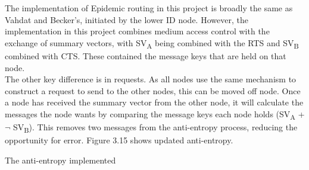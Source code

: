\documentclass[12pt,a4paper]{report}
\makeatletter
\newenvironment{figurehere}
  {\def\@captype{figure}}
  {}
\makeatother
\begin{document}
The implementation of Epidemic routing in this project is broadly the same as Vahdat and Becker's, initiated by the lower ID node. However, the implementation in this project combines medium access control with the exchange of summary vectors, with SV\textsubscript{A} being combined with the RTS and SV\textsubscript{B} combined with CTS. These contained the message keys that are held on that node. \\
The other key difference is in requests. As all nodes use the same mechanism to construct a request to send to the other nodes, this can be moved off node. Once a node has received the summary vector from the other node, it will calculate the messages the node wants by comparing the message keys each node holds (SV\textsubscript{A} + $\neg$ SV\textsubscript{B}). This removes two messages from the anti-entropy process, reducing the opportunity for error. Figure 3.15 shows updated anti-entropy.

\begin{figurehere} 
\begin{center}
\end{center}
\caption{The anti-entropy implemented}
\end{figurehere} 
\bigskip
\end{document}
